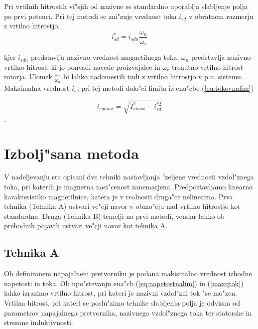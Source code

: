 \documentclass[journal,a4paper,twoside]{sty/IEEEtran}
\begin{document}
Pri vrtilnih hitrostih vi"sjih od nazivne se standardno uporablja slabljenje polja po prvi potenci. Pri tej metodi se zni"zuje vrednost toka $i_{sd}$ v obratnem razmerju z vrtilno hitrostjo,
\begin{equation}
\label{eq:standardna_metoda}
i_{sd}^*=i_{sdn}\frac{\omega_n}{\omega_r}
\end{equation}

kjer $i_{sdn}$ predstavlja nazivno vrednost magnetilnega toka, $\omega_{n}$ predstavlja nazivno vrtilno hitrost, ki jo ponvadi navede proizvajalec in $\omega_{r}$ trenutno vrtilno hitrost rotorja. Ulomek $\frac{\omega_r}{\omega_n}$ bi lahko nadomestili tudi z vrtilno hitrostjo v p.u. sistemu. Maksimalna vrednost $i_{sq}$ pri tej metodi dolo"ci limita iz ena"cbe (\ref{eq:tokovnalim})\cite{vas}

\begin{equation}
i_{sqmax}=\sqrt{I_{smax}^2-i_{sd}^{*2}}
\label{maxqtok}
\end{equation}.










\section{Izbolj"sana metoda}



V nadeljevanju sta opisani dve tehniki nastavljanja "zeljene vrednosti vzdol"znega toka, pri katerih je magnetna nasi"cenost zanemarjena. Predpostavljamo linearno karakteristiko magnetilnice, katera je v realnosti druga"ce nelinearna. Prva tehnika (Tehnika A) ustvari ve"cji navor v obmo"cju nad vrtilno hitrostjo kot standardna. Druga (Tehnika B) temelji na prvi metodi, vendar lahko ob prehodnih pojavih ustvari ve"cji navor kot tehnika A.\cite{vas}

\subsection{Tehnika A}
\label{sec:prva_metoda}


Ob definiranem napajalnem pretvorniku je podana makismalno vrednost izhodne napetosti in toka. Ob upo"stevanju ena"cb (\ref{eq:napetostnalim}) in (\ref{maxqtok}) lahko izrazimo vrtilno hitrost, pri kateri je nazivni vzdol"zni tok "se mo"zen. Vrtilna hitrost, pri kateri se poslu"zimo tehnike slabljenja polja je odvisna od parametrov napajalnega pretvornika, nazivnega vzdol"znega toka ter statorske in stresane induktivnosti. 
\end{document}
